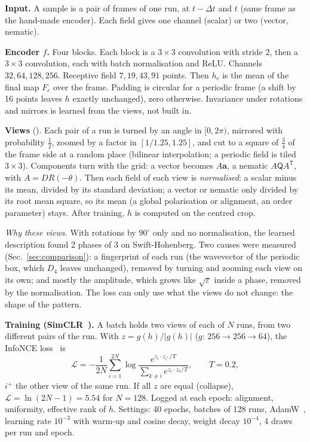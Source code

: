 \documentclass[11pt,a4paper]{article}
\newcommand{\repo}{https://github.com/Lu-Dumoulin/PhaseWall}
\newcommand{\srcref}[1]{\href{\repo/blob/main/#1}{\texttt{\detokenize{#1}}}}
\begin{document}
\begin{tech}
\textbf{Input.} A sample is a pair of frames of one run, at $t-\Delta t$ and $t$ (same frame as the hand-made
encoder). Each field gives one channel (scalar) or two (vector, nematic).

\textbf{Encoder $f$.} Four blocks. Each block is a $3\times3$ convolution with stride 2, then a $3\times3$
convolution, each with batch normalisation and ReLU. Channels $32,64,128,256$. Receptive field
$7,19,43,91$ points. Then $h_c$ is the mean of the final map $F_c$ over the frame. Padding is circular for a
periodic frame (a shift by 16 points leaves $h$ exactly unchanged), zero otherwise. Invariance under rotations
and mirrors is learned from the views, not built in.

\textbf{Views} (\srcref{src/phasewall/nn/views.py}). Each pair of a run is turned by an angle in $[0,2\pi)$,
mirrored with probability $\frac12$, zoomed by a factor in $[1/1.25,1.25]$, and cut to a square of $\frac34$
of the frame side at a random place (bilinear interpolation; a periodic field is tiled $3\times3$).
Components turn with the grid: a vector becomes $A\mathbf a$, a nematic $A\mathsf QA^{\mathsf T}$, with
$A=DR(-\theta)$. Then each field of each view is \emph{normalised}: a scalar minus its mean, divided by its
standard deviation; a vector or nematic only divided by its root mean square, so its mean (a global
polarisation or alignment, an order parameter) stays. After training, $h$ is computed on the centred crop.

\emph{Why these views.} With rotations by $90^\circ$ only and no normalisation, the learned description found
2 phases of 3 on Swift-Hohenberg. Two causes were measured (Sec.~\ref{sec:comparison}): a fingerprint of each
run (the wavevector of the periodic box, which $D_4$ leaves unchanged), removed by turning and zooming each view
on its own; and mostly the amplitude, which grows like $\sqrt\varepsilon$ inside a phase, removed by the
normalisation. The loss can only use what the views do not change: the shape of the pattern.

\textbf{Training (SimCLR~\cite{chen2020}).} A batch holds two views of each of $N$ runs, from two different
pairs of the run. With $z=g(h)/|g(h)|$ ($g$: $256\to256\to64$), the InfoNCE loss~\cite{oord2018} is
\[
\mathcal L=-\frac{1}{2N}\sum_{i=1}^{2N}\log\frac{e^{z_i\cdot z_{i^+}/T}}{\sum_{k\ne i}e^{z_i\cdot z_k/T}},\qquad T=0.2,
\]
$i^+$ the other view of the same run. If all $z$ are equal (collapse), $\mathcal L=\ln(2N-1)=5.54$ for
$N=128$. Logged at each epoch: alignment, uniformity, effective rank of $h$. Settings: 40 epochs, batches of
128 runs, AdamW~\cite{loshchilov2019}, learning rate $10^{-3}$ with warm-up and cosine decay, weight decay
$10^{-4}$, 4 draws per run and epoch.


\end{tech}
\end{document}

